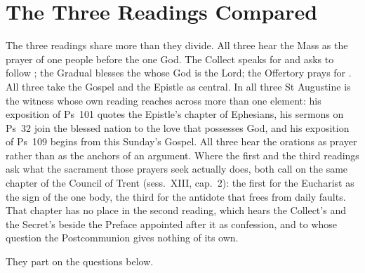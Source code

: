 \section{The Three Readings Compared}
\label{sec:comparison}

The three readings share more than they divide. All three hear the Mass as
the prayer of one people before the one God. The Collect speaks for
 and asks to follow ; the Gradual blesses
the  whose God is the Lord; the Offertory prays for
. All three take the
Gospel and the Epistle as central. In all three St Augustine is the witness
whose own reading reaches across more than one element: his exposition of
Ps~101 quotes the Epistle's chapter of Ephesians, his sermons on Ps~32 join the
blessed nation to the love that possesses God, and his exposition of Ps~109
begins from this Sunday's Gospel. All three hear the orations as prayer
rather than as the anchors of an argument. Where the first and the third
readings ask what the sacrament those prayers seek actually does, both call on
the same chapter of the Council of Trent (sess.~XIII, cap.~2): the first for
the Eucharist as the sign of the one body, the third for the antidote that
frees from daily faults. That chapter has no place in the second reading,
which hears the Collect's  and the Secret's
 beside the Preface appointed after it as confession, and to
whose question the Postcommunion gives nothing of its own.

They part on the questions below.

